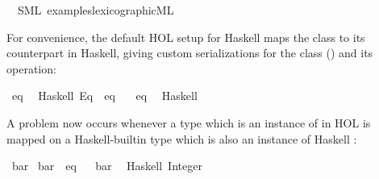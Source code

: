 \begin{isabellebody}
\ \ {\isacharparenleft}SML\ {\isachardoublequoteopen}examples{\isacharslash}lexicographic{\isachardot}ML{\isachardoublequoteclose}{\isacharparenright}%
\begin{isamarkuptext}%
%
\end{isamarkuptext}%
\isamarkuptrue%
%
\isamarkuptrue%
%
\begin{isamarkuptext}%
For convenience, the default
  HOL setup for Haskell maps the  class to
  its counterpart in Haskell, giving custom serializations
  for the class (\isa{{\isasymCODECLASS}}) and its operation:%
\end{isamarkuptext}%
\isamarkuptrue%
%
\isadelimML
%
\endisadelimML
%
\isatagML
%
\endisatagML
{\isafoldML}%
%
\isadelimML
%
\endisadelimML
\isanewline
%
\isadelimtt
%
\endisadelimtt
%
\isatagtt
{}\isamarkupfalse%
\ eq\isanewline
\ \ {\isacharparenleft}Haskell\ {\isachardoublequoteopen}Eq{\isachardoublequoteclose}\ \ eq\ {\isasymequiv}\ {\isachardoublequoteopen}{\isacharparenleft}{\isacharequal}{\isacharequal}{\isacharparenright}{\isachardoublequoteclose}{\isacharparenright}\isanewline
\isanewline
{}\isamarkupfalse%
\ eq\isanewline
\ \ {\isacharparenleft}Haskell\ \ {}\ {\isachardoublequoteopen}{\isacharequal}{\isacharequal}{\isachardoublequoteclose}{\isacharparenright}\isanewline
%
\endisatagtt
{\isafoldtt}%
%
\isadelimtt
%
\endisadelimtt
%
\isadelimML
%
\endisadelimML
%
\isatagML
%
\endisatagML
{\isafoldML}%
%
\isadelimML
%
\endisadelimML
%
\begin{isamarkuptext}%
A problem now occurs whenever a type which
  is an instance of  in HOL is mapped
  on a Haskell-builtin type which is also an instance
  of Haskell :%
\end{isamarkuptext}%
\isamarkuptrue%
\isamarkupfalse%
\ bar\isanewline
\isanewline
{}\isamarkupfalse%
\ bar\ {\isacharcolon}{\isacharcolon}\ eq%
\isadelimproof
\ %
\endisadelimproof
%
\isatagproof
\isacommand{{\isachardot}{\isachardot}}\isamarkupfalse%
%
\endisatagproof
{\isafoldproof}%
%
\isadelimproof
%
\endisadelimproof
\isanewline
%
\isadelimtt
\isanewline
%
\endisadelimtt
%
\isatagtt
{}\isamarkupfalse%
\ bar\isanewline
\ \ {\isacharparenleft}Haskell\ {\isachardoublequoteopen}Integer{\isachardoublequoteclose}{\isacharparenright}%
\endisatagtt
{\isafoldtt}%

\end{isabellebody}
